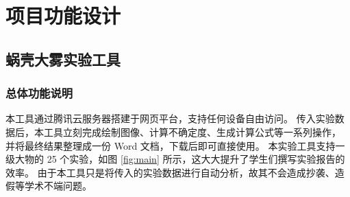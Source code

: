 \section{项目功能设计}

\subsection{蜗壳大雾实验工具}

\subsubsection{总体功能说明}

本工具通过腾讯云服务器搭建于网页平台，支持任何设备自由访问。
传入实验数据后，本工具立刻完成绘制图像、计算不确定度、生成计算公式等一系列操作，
并将最终结果整理成一份 Word 文档，下载后即可直接使用。
本实验工具支持一级大物的 25 个实验，如图 \ref{fig:main} 所示，这大大提升了学生们撰写实验报告的效率。
由于本工具只是将传入的实验数据进行自动分析，故其不会造成抄袭、造假等学术不端问题。

